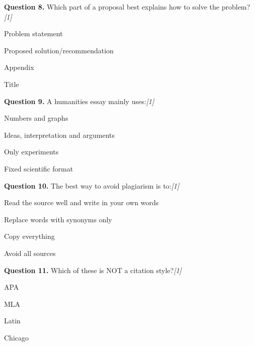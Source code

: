 \documentclass[11pt,a4paper]{article}
\newcommand{\pts}[1]{\hfill   \textit{[#1]}}
\begin{document}
\medskip




\noindent   \textbf{Question 8.} Which part of a proposal best explains how to solve the problem?\pts{1}

\begin{parts}
  \item Problem statement
  \item Proposed solution/recommendation
  \item Appendix
  \item Title
\end{parts}

\medskip




\noindent   \textbf{Question 9.} A humanities essay mainly uses:\pts{1}

\begin{parts}
  \item Numbers and graphs
  \item Ideas, interpretation and arguments
  \item Only experiments
  \item Fixed scientific format
\end{parts}

\medskip




\noindent   \textbf{Question 10.} The best way to avoid plagiarism is to:\pts{1}

\begin{parts}
  \item Read the source well and write in your own words
  \item Replace words with synonyms only
  \item Copy everything
  \item Avoid all sources
\end{parts}

\medskip




\noindent   \textbf{Question 11.} Which of these is NOT a citation style?\pts{1}

\begin{parts}
  \item APA
  \item MLA
  \item Latin
  \item Chicago
\end{parts}

\medskip
\end{document}
